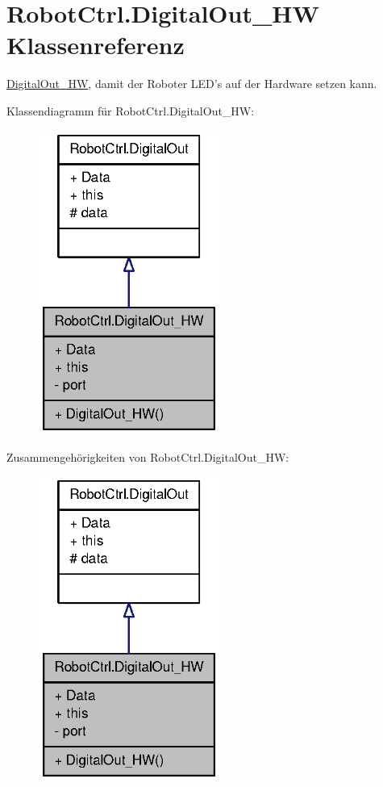 \hypertarget{class_robot_ctrl_1_1_digital_out___h_w}{
\section{RobotCtrl.DigitalOut\_\-HW Klassenreferenz}
\label{class_robot_ctrl_1_1_digital_out___h_w}
}


\hyperlink{class_robot_ctrl_1_1_digital_out___h_w}{DigitalOut\_\-HW}, damit der Roboter LED's auf der Hardware setzen kann.  




Klassendiagramm für RobotCtrl.DigitalOut\_\-HW:\nopagebreak
\begin{figure}[H]
\begin{center}
\leavevmode
\includegraphics[width=168pt]{class_robot_ctrl_1_1_digital_out___h_w__inherit__graph}
\end{center}
\end{figure}


Zusammengehörigkeiten von RobotCtrl.DigitalOut\_\-HW:\nopagebreak
\begin{figure}[H]
\begin{center}
\leavevmode
\includegraphics[width=168pt]{class_robot_ctrl_1_1_digital_out___h_w__coll__graph}
\end{center}
\end{figure}

